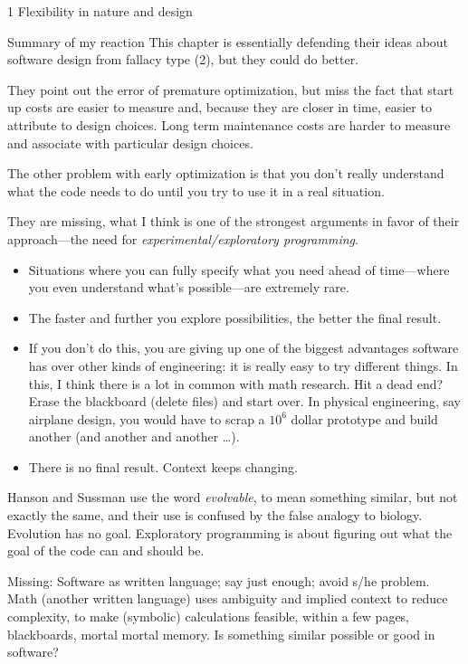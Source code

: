 \documentclass[12pt]{PalisadesLakesBook}
\begin{document}
\begin{plSection}{1 Flexibility in nature and design}
\begin{plSection}{Summary of my reaction}
This chapter is essentially defending their ideas about software
design from fallacy type (2),
but they could do better.

They point out the error of premature optimization,
but miss the fact that start up costs are easier to measure
and, because they are closer in time, easier to attribute to
design choices. 
Long term maintenance costs are harder to measure and
associate with particular design choices.

The other problem with early optimization is that you don't
really understand what the code needs to do until you try to
use it in a real situation.

They are missing, what I think is one of the strongest arguments
in favor of their approach---the need for 
\emph{experimental/exploratory programming}.
\begin{itemize}

  \item Situations where you can fully specify what you need
  ahead of time---where you even understand what's 
  possible---are extremely rare.

  \item The faster and further you explore possibilities,
  the better the final result.

  \item If you don't do this, you are giving up one of the
  biggest advantages software has over other kinds of engineering:
  it is really easy to try different things.
  In this, I think there is a lot in common with math research.
  Hit a dead end? Erase the blackboard (delete files) 
  and start over.
  In physical engineering, say airplane design, you would have
  to scrap a $10^{6}$ dollar prototype and build another
  (and another and another {\ldots}).
  
  \item There is no final result. Context keeps changing.
  
\end{itemize}
Hanson and Sussman use the word \emph{evolvable}, 
to mean something similar, but not exactly the same,
and their use is confused by the false analogy to biology.
Evolution has no goal. 
Exploratory programming is about figuring out what the goal 
of the code can and should be.

Missing:
Software as written language; 
say just enough; avoid s/he problem.
Math (another written language) uses ambiguity
and implied context to reduce complexity,
to make (symbolic) calculations feasible,
within a few pages, blackboards, mortal mortal memory.
Is something similar possible or good in software? 


\end{plSection}
\end{plSection}
\end{document}
